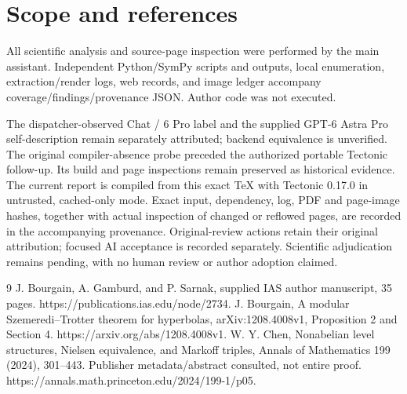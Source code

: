 \documentclass[10pt]{article}
\begin{document}
\section*{Scope and references}
All scientific analysis and source-page inspection were performed by the main assistant. Independent Python/SymPy scripts and outputs, local enumeration, extraction/render logs, web records, and image ledger accompany coverage/findings/provenance JSON. Author code was not executed.\par
The dispatcher-observed Chat / 6 Pro label and the supplied GPT-6 Astra Pro self-description remain separately attributed; backend equivalence is unverified. The original compiler-absence probe preceded the authorized portable Tectonic follow-up. Its build and page inspections remain preserved as historical evidence. The current report is compiled from this exact TeX with Tectonic 0.17.0 in untrusted, cached-only mode. Exact input, dependency, log, PDF and page-image hashes, together with actual inspection of changed or reflowed pages, are recorded in the accompanying provenance. Original-review actions retain their original attribution; focused AI acceptance is recorded separately. Scientific adjudication remains pending, with no human review or author adoption claimed.\par
9 J. Bourgain, A. Gamburd, and P. Sarnak, supplied IAS author manuscript, 35 pages. https://publications.ias.edu/node/2734. J. Bourgain, A modular Szemeredi–Trotter theorem for hyperbolas, arXiv:1208.4008v1, Proposition 2 and Section 4. https://arxiv.org/abs/1208.4008v1. W. Y. Chen, Nonabelian level structures, Nielsen equivalence, and Markoff triples, Annals of Mathematics 199 (2024), 301–443. Publisher metadata/abstract consulted, not entire proof. https://annals.math.princeton.edu/2024/199-1/p05.\par
\end{document}
